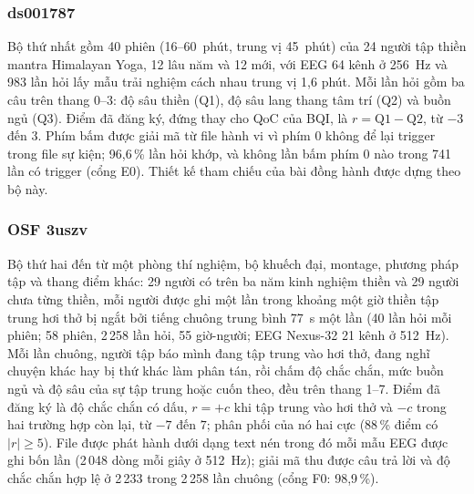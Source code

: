\subsubsection{ds001787}
Bộ thứ nhất \cite{Brandmeyer2018,Delorme2024ds} gồm 40 phiên (16--60~phút, trung vị 45~phút) của 24 người tập thiền mantra Himalayan Yoga, 12 lâu năm và 12 mới, với EEG 64 kênh ở 256~Hz và 983 lần hỏi lấy mẫu trải nghiệm cách nhau trung vị 1,6 phút. Mỗi lần hỏi gồm ba câu trên thang 0--3: độ sâu thiền (Q1), độ sâu lang thang tâm trí (Q2) và buồn ngủ (Q3). Điểm đã đăng ký, đứng thay cho QoC của BQI, là $r=\mathrm{Q1}-\mathrm{Q2}$, từ $-3$ đến $3$. Phím bấm được giải mã từ file hành vi vì phím 0 không để lại trigger trong file sự kiện; 96,6\,\% lần hỏi khớp, và không lần bấm phím 0 nào trong 741 lần có trigger (cổng E0). Thiết kế tham chiếu của bài đồng hành được dựng theo bộ này.

\subsubsection{OSF 3uszv}
Bộ thứ hai \cite{RodriguezLarios2021} đến từ một phòng thí nghiệm, bộ khuếch đại, montage, phương pháp tập và thang điểm khác: 29 người có trên ba năm kinh nghiệm thiền và 29 người chưa từng thiền, mỗi người được ghi một lần trong khoảng một giờ thiền tập trung hơi thở bị ngắt bởi tiếng chuông trung bình 77~s một lần (40 lần hỏi mỗi phiên; 58 phiên, 2\,258 lần hỏi, 55 giờ-người; EEG Nexus-32 21 kênh ở 512~Hz). Mỗi lần chuông, người tập báo mình đang tập trung vào hơi thở, đang nghĩ chuyện khác hay bị thứ khác làm phân tán, rồi chấm độ chắc chắn, mức buồn ngủ và độ sâu của sự tập trung hoặc cuốn theo, đều trên thang 1--7. Điểm đã đăng ký là độ chắc chắn có dấu, $r=+c$ khi tập trung vào hơi thở và $-c$ trong hai trường hợp còn lại, từ $-7$ đến $7$; phân phối của nó hai cực (88\,\% điểm có $|r|\ge5$). File được phát hành dưới dạng text nén trong đó mỗi mẫu EEG được ghi bốn lần (2\,048 dòng mỗi giây ở 512~Hz); giải mã thu được câu trả lời và độ chắc chắn hợp lệ ở 2\,233 trong 2\,258 lần chuông (cổng F0: 98,9\,\%).

